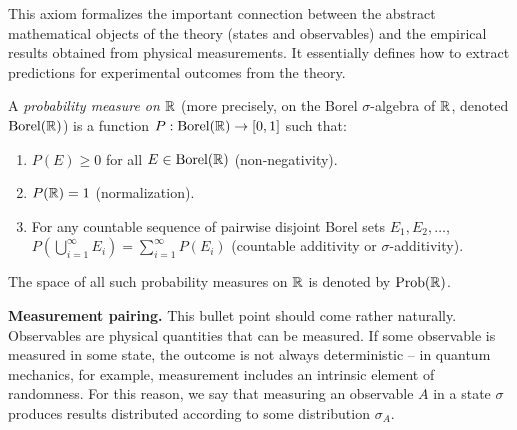 This axiom formalizes the important connection between the abstract mathematical objects of the theory (states and observables) and the empirical results obtained from physical measurements. It essentially defines how to extract predictions for experimental outcomes from the theory.

\begin{definition}
A \textit{probability measure on $\mathbb{R}$} (more precisely, on the Borel $\sigma$-algebra of $\mathbb{R}$, denoted $\text{Borel}(\mathbb{R})$) is a function $P: \text{Borel}(\mathbb{R}) \to [0,1]$ such that:
\begin{enumerate}
    \item $P(E) \ge 0$ for all $E \in \text{Borel}(\mathbb{R})$ (non-negativity).
    \item $P(\mathbb{R}) = 1$ (normalization).
    \item For any countable sequence of pairwise disjoint Borel sets $E_1, E_2, \dots$, $P(\bigcup_{i=1}^\infty E_i) = \sum_{i=1}^\infty P(E_i)$ (countable additivity or $\sigma$-additivity).
\end{enumerate}
The space of all such probability measures on $\mathbb{R}$ is denoted by $\text{Prob}(\mathbb{R})$.
\end{definition}

\textbf{Measurement pairing.} This bullet point should come rather naturally. Observables are physical quantities that can be measured. If some observable is measured in some state, the outcome is not always deterministic -- in quantum mechanics, for example, measurement includes an intrinsic element of randomness. For this reason, we say that measuring an observable $A$ in a state $\sigma$ produces results distributed according to some distribution $\sigma_A$.



